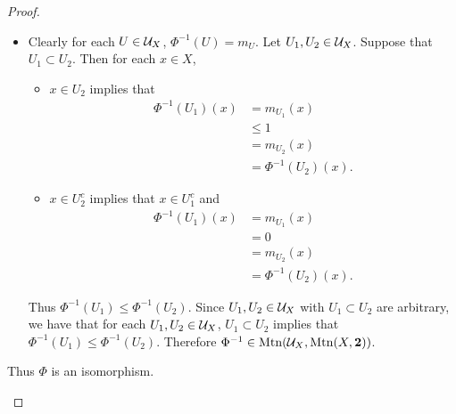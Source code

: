 \documentclass{book}
\begin{document}
\begin{proof}
\begin{enumerate}
\begin{itemize}
\begin{itemize}
\begin{align*}
						& = U \quad \text{(by \rd{def:ordered_sets:upper_lower_sets:intro:0020})}.
					\end{align*}
					Since $U \in \MU_X$ is arbitrary, we have that for each $U \in \MU_X$, there exists $f \in \Mtn(X, \2)$ such that $\Phi(f) = U$. Thus $\Phi$ is surjective.
				\end{itemize}
				Therefore $\Phi$ is a bijection.
				\item Clearly for each $U \in \MU_X$, $\Phi^{-1}(U) = m_U$. Let $U_1, U_2 \in \mathcal{U}_X$. Suppose that $U_1 \subset U_2$. Then for each $x \in X$, 
				\begin{itemize}
					\item $x \in U_2$ implies that
					\begin{align*}
						\Phi^{-1}(U_1)(x)
						& = m_{U_1}(x) \\
						& \leq 1 \\
						& = m_{U_2}(x) \\
						& = \Phi^{-1}(U_2)(x).
					\end{align*}
					\item $x \in U_2^c$ implies that $x \in U_1^c$ and 
					\begin{align*}
						\Phi^{-1}(U_1)(x)
						& = m_{U_1}(x) \\
						& = 0 \\
						& = m_{U_2}(x) \\
						& = \Phi^{-1}(U_2)(x).
					\end{align*}
				\end{itemize}
				Thus $\Phi^{-1}(U_1) \leq \Phi^{-1}(U_2)$. Since $U_1, U_2 \in \mathcal{U}_X$ with $U_1 \subset U_2$ are arbitrary, we have that for each $U_1, U_2 \in \mathcal{U}_X$, $U_1 \subset U_2$ implies that $\Phi^{-1}(U_1) \leq \Phi^{-1}(U_2)$. Therefore $\Phi^{-1} \in \operatorname{\text{Mtn}}(\mathcal{U}_X, \operatorname{\text{Mtn}}(X, \mathbf{2}))$. 
			\end{itemize}
			Thus $\Phi$ is an isomorphism. 
		\end{enumerate}
	\end{proof}
	
	
	
	
	
	
	
	
	
	
	
	
	
	
	
	
	
	
	
	
\end{document}
